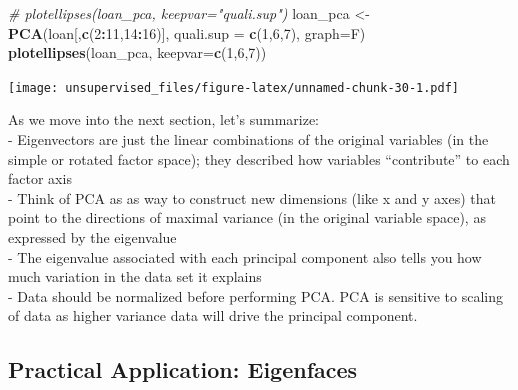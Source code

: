 \documentclass[]{article}
\newenvironment{Shaded}{\begin{snugshade}}{\end{snugshade}}
\newcommand{\CommentTok}[1]{\textcolor[rgb]{0.56,0.35,0.01}{\textit{#1}}}
\newcommand{\DataTypeTok}[1]{\textcolor[rgb]{0.13,0.29,0.53}{#1}}
\newcommand{\DecValTok}[1]{\textcolor[rgb]{0.00,0.00,0.81}{#1}}
\newcommand{\KeywordTok}[1]{\textcolor[rgb]{0.13,0.29,0.53}{\textbf{#1}}}
\newcommand{\NormalTok}[1]{#1}
\newcommand{\OperatorTok}[1]{\textcolor[rgb]{0.81,0.36,0.00}{\textbf{#1}}}
\newcommand{\StringTok}[1]{\textcolor[rgb]{0.31,0.60,0.02}{#1}}
\begin{document}
\begin{Shaded}
\begin{Highlighting}[]
\CommentTok{# plotellipses(loan_pca, keepvar="quali.sup")}
\NormalTok{loan_pca <-}\StringTok{ }\KeywordTok{PCA}\NormalTok{(loan[,}\KeywordTok{c}\NormalTok{(}\DecValTok{2}\OperatorTok{:}\DecValTok{11}\NormalTok{,}\DecValTok{14}\OperatorTok{:}\DecValTok{16}\NormalTok{)], }\DataTypeTok{quali.sup =} \KeywordTok{c}\NormalTok{(}\DecValTok{1}\NormalTok{,}\DecValTok{6}\NormalTok{,}\DecValTok{7}\NormalTok{), }\DataTypeTok{graph=}\NormalTok{F)}
\KeywordTok{plotellipses}\NormalTok{(loan_pca, }\DataTypeTok{keepvar=}\KeywordTok{c}\NormalTok{(}\DecValTok{1}\NormalTok{,}\DecValTok{6}\NormalTok{,}\DecValTok{7}\NormalTok{))}
\end{Highlighting}
\end{Shaded}

\texttt{[image: unsupervised\_files/figure-latex/unnamed-chunk-30-1.pdf]}

As we move into the next section, let's summarize:\\
- Eigenvectors are just the linear combinations of the original
variables (in the simple or rotated factor space); they described how
variables ``contribute'' to each factor axis\\
- Think of PCA as as way to construct new dimensions (like x and y axes)
that point to the directions of maximal variance (in the original
variable space), as expressed by the eigenvalue\\
- The eigenvalue associated with each principal component also tells you
how much variation in the data set it explains\\
- Data should be normalized before performing PCA. PCA is sensitive to
scaling of data as higher variance data will drive the principal
component.

\hypertarget{practical-application-eigenfaces}{%
\subsection{Practical Application:
Eigenfaces}\label{practical-application-eigenfaces}}
\end{document}
